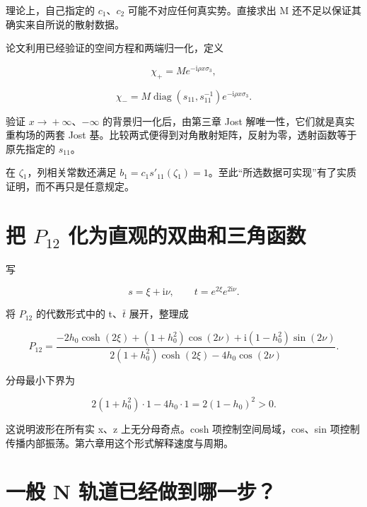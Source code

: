 理论上，自己指定的 $c_{1}$、$c_{2}$ 可能不对应任何真实势。直接求出 M 还不足以保证其确实来自所说的散射数据。\par

论文利用已经验证的空间方程和两端归一化，定义\par

\[
\chi_+=M e^{-\mathrm{i}\rho x\sigma_3},
\]

\[
\chi_-=M\operatorname{diag}(s_{11},s_{11}^{-1})
e^{-\mathrm{i}\rho x\sigma_3}.
\]

验证 $x\to{}+\infty{}$、$-\infty{}$ 的背景归一化后，由第三章 Jost 解唯一性，它们就是真实重构场的两套 Jost 基。比较两式便得到对角散射矩阵，反射为零，透射函数等于原先指定的 $s_{11}$。\par

在 $\zeta{}_{1}$，列相关常数还满足 $b_{1}=c_{1}s'_{11}(\zeta{}_{1})=1$。至此“所选数据可实现”有了实质证明，而不再只是任意规定。\par

\section{把 \texorpdfstring{$P_{12}$}{P12} 化为直观的双曲和三角函数}
\par

写\par

\[
s=\xi+\mathrm{i}\nu,\qquad
t=e^{2\xi}e^{2\mathrm{i}\nu}.
\]

将 $P_{12}$ 的代数形式中的 t、$\bar t$ 展开，整理成\par

\[
P_{12}=
\dfrac{
-2h_0\cosh(2\xi)
+(1+h_0^2)\cos(2\nu)
+\mathrm{i}(1-h_0^2)\sin(2\nu)
}{
2(1+h_0^2)\cosh(2\xi)-4h_0\cos(2\nu)
}.
\]

分母最小下界为\par

\[
2(1+h_0^2)\cdot1-4h_0\cdot1
=2(1-h_0)^2>0.
\]

这说明波形在所有实 x、z 上无分母奇点。cosh 项控制空间局域，cos、sin 项控制传播内部振荡。第六章用这个形式解释速度与周期。\par

\section{一般 N 轨道已经做到哪一步？}
\par


